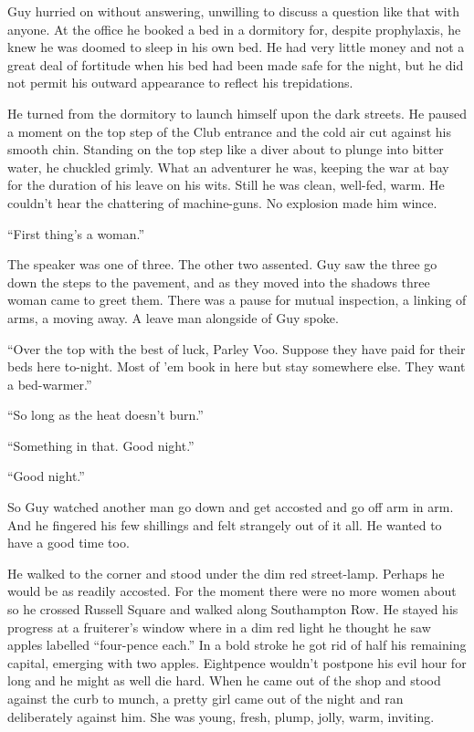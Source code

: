 Guy hurried on without answering, unwilling to discuss a question like that with anyone. At the office he booked a bed in a dormitory for, despite prophylaxis, he knew he was doomed to sleep in his own bed. He had very little money and not a great deal of fortitude when his bed had been made safe for the night, but he did not permit his outward appearance to reflect his trepidations.

He turned from the dormitory to launch himself upon the dark streets. He paused a moment on the top step of the Club entrance and the cold air cut against his smooth chin. Standing on the top step like a diver about to plunge into bitter water, he chuckled grimly. What an adventurer he was, keeping the war at bay for the duration of his leave on his wits. Still he was clean, well-fed, warm. He couldn't hear the chattering of machine-guns. No explosion made him wince.

``First thing's a woman.''

The speaker was one of three. The other two assented. Guy saw the three go down the steps to the pavement, and as they moved into the shadows three woman came to greet them. There was a pause for mutual inspection, a linking of arms, a moving away. A leave man alongside of Guy spoke.

``Over the top with the best of luck, Parley Voo. Suppose they have paid for their beds here to-night. Most of 'em book in here but stay somewhere else. They want a bed-warmer.''

``So long as the heat doesn't burn.''

``Something in that. Good night.''

``Good night.''

So Guy watched another man go down and get accosted and go off arm in arm. And he fingered his few shillings and felt strangely out of it all. He wanted to have a good time too.

He walked to the corner and stood under the dim red street-lamp. Perhaps he would be as readily accosted. For the moment there were no more women about so he crossed Russell Square and walked along Southampton Row. He stayed his progress at a fruiterer's window where in a dim red light he thought he saw apples labelled ``four-pence each.'' In a bold stroke he got rid of half his remaining capital, emerging with two apples. Eightpence wouldn't postpone his evil hour for long and he might as well die hard. When he came out of the shop and stood against the curb to munch, a pretty girl came out of the night and ran deliberately against him. She was young, fresh, plump, jolly, warm, inviting.

